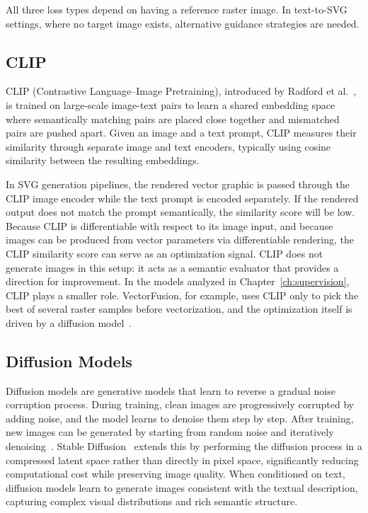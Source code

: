 All three loss types depend on having a reference raster 
image. In text-to-SVG settings, where no target image 
exists, alternative guidance strategies are needed.

\subsection{CLIP}
\label{sec:clip}

CLIP (Contrastive Language--Image Pretraining), introduced 
by Radford et al.~\cite{radfordLearningTransferableVisual2021}, 
is trained on large-scale image-text pairs to learn a 
shared embedding space where semantically matching pairs 
are placed close together and mismatched pairs are pushed 
apart. Given an image and a text prompt, CLIP measures 
their similarity through separate image and text encoders, 
typically using cosine similarity between the resulting 
embeddings.

In SVG generation pipelines, the rendered vector graphic 
is passed through the CLIP image encoder while the text 
prompt is encoded separately. If the rendered output does 
not match the prompt semantically, the similarity score 
will be low. Because CLIP is differentiable with respect 
to its image input, and because images can be produced 
from vector parameters via differentiable rendering, the 
CLIP similarity score can serve as an optimization signal. 
CLIP does not generate images in this setup: it acts as 
a semantic evaluator that provides a direction for 
improvement. In the models analyzed in 
Chapter~\ref{ch:supervision}, CLIP plays a smaller role. 
VectorFusion, for example, uses CLIP only to pick the best 
of several raster samples before vectorization, and the 
optimization itself is driven by a diffusion 
model~\cite{jainVectorFusionTexttoSVGAbstracting2022}.

\subsection{Diffusion Models}

Diffusion models are generative models that learn to 
reverse a gradual noise corruption process. During 
training, clean images are progressively corrupted by 
adding noise, and the model learns to denoise them step 
by step. After training, new images can be generated by 
starting from random noise and iteratively 
denoising~\cite{ho2020denoising}. Stable 
Diffusion~\cite{rombachHighResolutionImageSynthesis2021} extends this by 
performing the diffusion process in a compressed latent 
space rather than directly in pixel space, significantly 
reducing computational cost while preserving image quality. 
When conditioned on text, diffusion models learn to 
generate images consistent with the textual description, 
capturing complex visual distributions and rich semantic 
structure.

